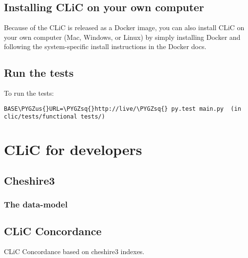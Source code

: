 \documentclass[letterpaper,10pt,english]{sphinxmanual}
\def\PYGZus{\char`\_}
\def\PYGZsq{\char`\'}
\renewcommand\PYGZsq{\textquotesingle}
\begin{document}
\section{Installing CLiC on your own computer}
\label{admin:installing-clic-on-your-own-computer}
Because of the CLiC is released as a Docker image, you can also install CLiC on
your own computer (Mac, Windows, or Linux) by simply installing Docker and
following the system-specific install instructions in the Docker docs.


\section{Run the tests}
\label{admin:run-the-tests}
To run the tests:

\begin{Verbatim}[commandchars=\\\{\}]
BASE\PYGZus{}URL=\PYGZsq{}http://live/\PYGZsq{} py.test main.py  (in
clic/tests/functional tests/)
\end{Verbatim}


\chapter{CLiC for developers}
\label{apidoc::doc}\label{apidoc:clic-for-developers}

\section{Cheshire3}
\label{apidoc:cheshire3}

\subsection{The data-model}
\label{apidoc:the-data-model}

\section{CLiC Concordance}
\label{apidoc:clic-concordance}\label{apidoc:module-concordance}
CLiC Concordance based on cheshire3 indexes.
\end{document}
